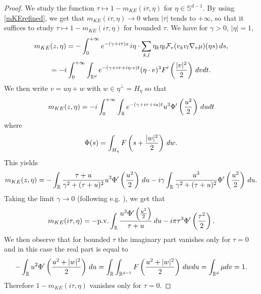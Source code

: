 \documentclass[11pt]{amsart}
\numberwithin{equation}{section}
\newcommand{\R}{\mathbb{R}}
\newcommand{\na}{\nabla}
\begin{document}
 \begin{proof}
 We study the function $ \tau\mapsto 1-m_{KE}(i \tau, \eta)$ for $\eta \in \mathbb{S}^{d-1}.$
  By using  \eqref{mKErefined}, we get that $m_{KE}(i\tau, \eta) \rightarrow 0$ when 
   $| \tau |$ tends to $+\infty$, so that it suffices to study $ \tau\mapsto 1-m_{KE}(i \tau, \eta)$
    for bounded $\tau$.  
  We have for $\gamma >0$, $|\eta|= 1$, 
  \begin{multline*} m_{KE}(z, \eta)=   -   \int_{0}^{+ \infty} e^{-(\gamma + i \tau)s}\, i \eta \cdot   \sum_{k,l} \eta_k \eta_l \mathcal{F}_v( v_k v_l \na_v \mu)(\eta s) \, d s,
  \\= - i \int_{0}^{+ \infty} \int_{\mathbb{R}^d}  e^{ -( \gamma + i \tau  + i \eta \cdot v) t} (\eta \cdot v)^3
   F'\left({|v|^2 \over 2}\right) \, dv dt.
  \end{multline*}
  We then write $v= u \eta + w$ with $w \in \eta^{\perp}= H_{\eta}$ so that
  $$  m_{KE}(z, \eta)= - i \int_{0}^{+ \infty} \int_{\mathbb{R}}  e^{ -( \gamma + i \tau  + i  u) t} 
   u^3 \Phi'\left( {  u^2 \over 2} \right)\, du dt$$
   where
    \begin{equation}
    \label{Phidefpen}\Phi(s)= \int_{H_{\eta}} F \left(  s  + {|w|^2 \over 2} \right) \, dw.
    \end{equation}
    This yields
  $$  m_{KE}(z, \eta) = - \int_{\mathbb{R}} { \tau + u \over \gamma^2 + (\tau + u)^2} u^3 \Phi'\left( {  u^2 \over 2} \right) \, du 
   - i \gamma \int_{\mathbb{R}}  {  u^3 \over \gamma^2 + (\tau + u)^2}  \Phi'\left( {  u^2 \over 2} \right) \, du.$$
   Taking the limit $\gamma \rightarrow 0$ (following e.g. \cite[Proof of Prop. 2.1]{MV}), we get that
   $$ m_{KE}(i\tau, \eta)
   = - \mbox{p.v.} \int_{\mathbb{R}} {u^3\Phi'\left( {  u^2 \over 2} \right)  \over \tau + u} \, du - i\pi \tau^3 \Phi'\left( {  \tau^2 \over 2} \right).$$
   We then observe that for bounded $\tau$ the imaginary part vanishes only for $\tau=0$
    and in this case the real part
    is equal to
    $$ - \int_{\mathbb{R}} u^2 \Phi' \left( {u^2 + |w|^2  \over 2}\right) \, du= \int_{\mathbb{R}} \int_{\R^{d-1}} F\left( {u^2 + |w|^2  \over 2}\right)\, dw du= \int_{\mathbb{R}^d}
     \mu  dv= 1.$$
     Therefore $1 - m_{KE}(i\tau, \eta)$ vanishes only for $\tau = 0$.
     
     \bigskip
     

\end{proof}
\end{document}
